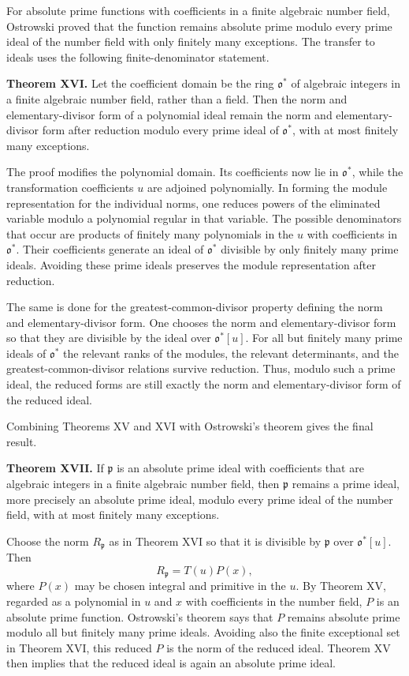 \documentclass[11pt]{article}
\begin{document}
For absolute prime functions with coefficients in a finite algebraic number field, Ostrowski proved that the function remains absolute prime modulo every prime ideal of the number field with only finitely many exceptions. The transfer to ideals uses the following finite-denominator statement.

\textbf{Theorem XVI.} Let the coefficient domain be the ring $\mathfrak o^*$ of algebraic integers in a finite algebraic number field, rather than a field. Then the norm and elementary-divisor form of a polynomial ideal remain the norm and elementary-divisor form after reduction modulo every prime ideal of $\mathfrak o^*$, with at most finitely many exceptions.

The proof modifies the polynomial domain. Its coefficients now lie in $\mathfrak o^*$, while the transformation coefficients $u$ are adjoined polynomially. In forming the module representation for the individual norms, one reduces powers of the eliminated variable modulo a polynomial regular in that variable. The possible denominators that occur are products of finitely many polynomials in the $u$ with coefficients in $\mathfrak o^*$. Their coefficients generate an ideal of $\mathfrak o^*$ divisible by only finitely many prime ideals. Avoiding these prime ideals preserves the module representation after reduction.

The same is done for the greatest-common-divisor property defining the norm and elementary-divisor form. One chooses the norm and elementary-divisor form so that they are divisible by the ideal over $\mathfrak o^*[u]$. For all but finitely many prime ideals of $\mathfrak o^*$ the relevant ranks of the modules, the relevant determinants, and the greatest-common-divisor relations survive reduction. Thus, modulo such a prime ideal, the reduced forms are still exactly the norm and elementary-divisor form of the reduced ideal.

Combining Theorems XV and XVI with Ostrowski's theorem gives the final result.

\textbf{Theorem XVII.} If $\mathfrak p$ is an absolute prime ideal with coefficients that are algebraic integers in a finite algebraic number field, then $\mathfrak p$ remains a prime ideal, more precisely an absolute prime ideal, modulo every prime ideal of the number field, with at most finitely many exceptions.

Choose the norm $R_{\mathfrak p}$ as in Theorem XVI so that it is divisible by $\mathfrak p$ over $\mathfrak o^*[u]$. Then
\[
  R_{\mathfrak p}=T(u)P(x),
\]
where $P(x)$ may be chosen integral and primitive in the $u$. By Theorem XV, regarded as a polynomial in $u$ and $x$ with coefficients in the number field, $P$ is an absolute prime function. Ostrowski's theorem says that $P$ remains absolute prime modulo all but finitely many prime ideals. Avoiding also the finite exceptional set in Theorem XVI, this reduced $P$ is the norm of the reduced ideal. Theorem XV then implies that the reduced ideal is again an absolute prime ideal.
\end{document}
